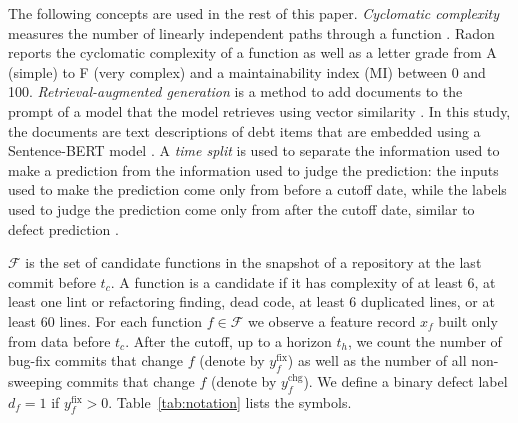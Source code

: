 \documentclass[12pt,onecolumn,draftclsnofoot]{IEEEtran}
\begin{document}
The following concepts are used in the rest of this paper. \emph{Cyclomatic complexity} measures the number of linearly independent paths through a function \cite{mccabe1976}. Radon reports the cyclomatic complexity of a function as well as a letter grade from A (simple) to F (very complex) and a maintainability index (MI) between 0 and 100. \emph{Retrieval-augmented generation} is a method to add documents to the prompt of a model that the model retrieves using vector similarity \cite{lewis2020}. In this study, the documents are text descriptions of debt items that are embedded using a Sentence-BERT model \cite{reimers2019}. A \emph{time split} is used to separate the information used to make a prediction from the information used to judge the prediction: the inputs used to make the prediction come only from before a cutoff date, while the labels used to judge the prediction come only from after the cutoff date, similar to defect prediction \cite{kamei2013}.

$\mathcal{F}$ is the set of candidate functions in the snapshot of a repository at the last commit before $t_c$. A function is a candidate if it has complexity of at least 6, at least one lint or refactoring finding, dead code, at least 6 duplicated lines, or at least 60 lines. For each function $f\in\mathcal{F}$ we observe a feature record $x_f$ built only from data before $t_c$. After the cutoff, up to a horizon $t_h$, we count the number of bug-fix commits that change $f$ (denote by $y^{\mathrm{fix}}_f$) as well as the number of all non-sweeping commits that change $f$ (denote by $y^{\mathrm{chg}}_f$). We define a binary defect label $d_f=1$ if $y^{\mathrm{fix}}_f>0$. Table~\ref{tab:notation} lists the symbols.
\end{document}

